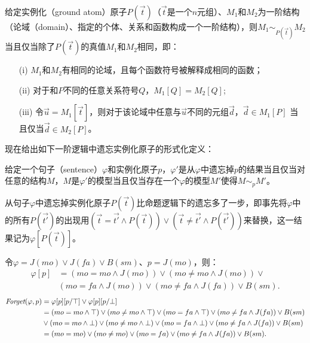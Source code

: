 给定实例化（ground atom）原子$P(\vec{t})$（$\vec{t}$是一个$n$元组）、$M_1$和$M_2$为一阶结构（论域（domain）、指定的个体、关系和函数构成一个一阶结构），则$M_1 \sim_{P(\vec{t})} M_2$ 当且仅当除了$P(\vec{t})$的真值$M_1$和$M_2$相同，即：
\begin{itemize}
	\item[(i)] $M_1$和$M_2$有相同的论域，且每个函数符号被解释成相同的函数；
	\item[(ii)] 对于和$P$不同的任意关系符号$Q$，$M_1[Q]=M_2[Q]$;
	\item[(iii)] 令$\vec{u} = M_1[\vec{t}]$，则对于该论域中任意与$\vec{u}$不同的元组$\vec{d}$，$\vec{d} \in M_1[P]$ 当且仅当$\vec{d} \in M_2[P]$。
\end{itemize}

现在给出如下一阶逻辑中遗忘实例化原子的形式化定义：
\begin{definition}\label{def:fol_fogetting}
	给定一个句子（sentence）$\varphi$和实例化原子$p$，$\varphi'$是从$\varphi$中遗忘掉$p$的结果当且仅当对任意的结构$M$，$M$是$\varphi'$的模型当且仅当存在一个$\varphi$的模型$M'$使得$M \sim_p M'$。
\end{definition}

从句子$\varphi$中遗忘掉实例化原子$P(\vec{t})$比命题逻辑下的遗忘多了一步，即事先将$\varphi$中的所有$P(\vec{t'})$的出现用$(\vec{t
} = \vec{t'}\wedge P(\vec{t})) \vee (\vec{t} \not= \vec{t'}\wedge P(\vec{t'}))$来替换，这一结果记为$\varphi[P(\vec{t})]$。

\begin{example}
	令$\varphi=J(mo) \vee J(fa) \vee B(sm)$、$p = J(mo)$，则：
	\begin{align*}
		\varphi[p] & = (mo = mo \wedge J(mo)) \vee (mo \not = mo \wedge J(mo)) \vee \\
		& (mo = fa \wedge J(mo)) \vee (mo \not = fa \wedge J(fa)) \vee B(sm).
	\end{align*}
	\begin{align*}
		\textit{Forget}(\varphi, p) & = \varphi[p][p/\top] \vee \varphi[p][p/\bot]\\
		& =  (mo = mo \wedge \top) \vee (mo \not = mo \wedge \top) \vee  (mo = fa \wedge \top) \vee (mo \not = fa \wedge J(fa)) \vee B(sm) \\
		&\vee (mo = mo \wedge \bot) \vee (mo \not = mo \wedge \bot) \vee  (mo = fa \wedge \bot) \vee (mo \not = fa \wedge J(fa)) \vee B(sm)\\
		& = (mo = mo )\vee (mo \not = mo) \vee  (mo = fa ) \vee  (mo \not = fa \wedge J(fa)) \vee B(sm).
	\end{align*}
\end{example}

